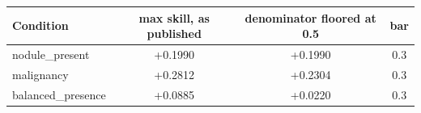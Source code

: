 \begin{tabular}{lccc}
\toprule
Condition & max skill, as published & denominator floored at 0.5 & bar \\
\midrule
nodule\_present & +0.1990 & +0.1990 & 0.3 \\
malignancy & +0.2812 & +0.2304 & 0.3 \\
balanced\_presence & +0.0885 & +0.0220 & 0.3 \\
\bottomrule
\end{tabular}
